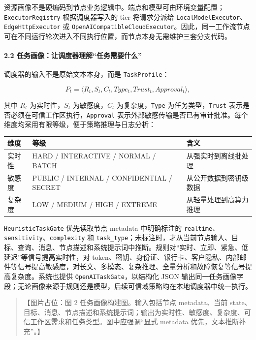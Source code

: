 \documentclass[UTF8,a4paper,12pt]{ctexart}
\begin{document}
资源画像不是硬编码到节点业务逻辑中。端点和模型可由环境变量配置；\texttt{ExecutorRegistry} 根据调度器写入的 tier 将请求分派给 \texttt{LocalModelExecutor}、\texttt{EdgeHttpExecutor} 或 \texttt{OpenAICompatibleCloudExecutor}。因此，同一工作流节点可在不同运行轮次进入不同执行位置，而节点本身无需维护三套分支代码。

\paragraph{2.2 任务画像：让调度器理解``任务需要什么''}

调度器的输入不是原始文本本身，而是 \texttt{TaskProfile}：

\[
P_t=\langle R_t,S_t,C_t,Type_t,Trust_t,Approval_t\rangle,
\]

其中 \(R_t\) 为实时性，\(S_t\) 为敏感度，\(C_t\) 为复杂度，\texttt{Type} 为任务类型，\texttt{Trust} 表示是否必须在可信工作区执行，\texttt{Approval} 表示外部敏感传输是否已有审计批准。每个维度均采用有限等级，便于策略推理与日志分析：

\begin{longtable}[]{@{}lll@{}}
\toprule
维度 & 等级 & 含义 \\
\midrule
\endhead
实时性 & HARD / INTERACTIVE / NORMAL / BATCH & 从强实时到离线批处理 \\
敏感度 & PUBLIC / INTERNAL / CONFIDENTIAL / SECRET & 从公开数据到密钥级数据 \\
复杂度 & LOW / MEDIUM / HIGH / EXTREME & 从轻量处理到高算力推理 \\
\bottomrule
\end{longtable}

\texttt{HeuristicTaskGate} 优先读取节点 metadata 中明确标注的 \texttt{realtime}、\texttt{sensitivity}、\texttt{complexity} 和 \texttt{task\_type}；未标注时，才从当前节点输入、目标、查询、消息、节点描述和系统提示词中推断。规则对``实时、立即、紧急、低延迟''等信号提高实时性，对 token、密钥、身份证、银行卡、客户隐私、内部邮件等信号提高敏感度，对长文、多模态、复杂推理、全量分析和故障恢复等信号提高复杂度。系统也提供 \texttt{OpenAITaskGate}，以结构化 JSON 输出同一任务画像字段；无论画像来源于规则还是模型，后续可信域策略均在本地调度器中统一执行。

\begin{quote}
【图片占位：图 2 任务画像构建图。输入包括节点 metadata、当前 state、目标、消息、节点描述和系统提示词；输出为实时性、敏感度、复杂度、可信工作区需求和任务类型。图中应强调``显式 metadata 优先，文本推断补充''。】
\end{quote}
\end{document}
